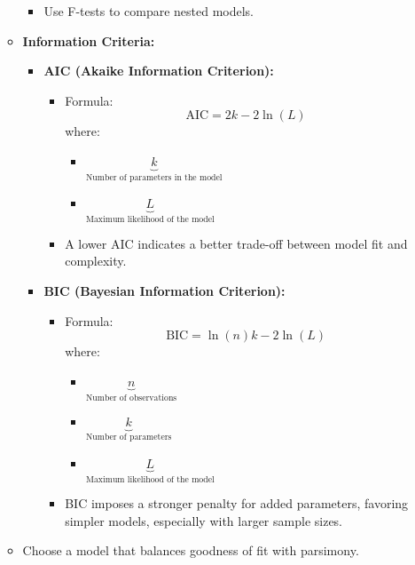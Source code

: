 \documentclass[10pt]{article}
\begin{document}
\begin{itemize}
\begin{itemize}
\begin{itemize}
            \item Use F-tests to compare nested models.
        \end{itemize}
        \item \textbf{Information Criteria:}
        \begin{itemize}
            \item \textbf{AIC (Akaike Information Criterion):}
            \begin{itemize}
                \item Formula: 
                \[
                \text{AIC} = 2k - 2\ln(L)
                \]
                where:
                \begin{itemize}
                    \item \(\underbrace{k}_{\text{Number of parameters in the model}}\)
                    \item \(\underbrace{L}_{\text{Maximum likelihood of the model}}\)
                \end{itemize}
                \item A lower AIC indicates a better trade-off between model fit and complexity.
            \end{itemize}
            \item \textbf{BIC (Bayesian Information Criterion):}
            \begin{itemize}
                \item Formula:
                \[
                \text{BIC} = \ln(n)k - 2\ln(L)
                \]
                where:
                \begin{itemize}
                    \item \(\underbrace{n}_{\text{Number of observations}}\)
                    \item \(\underbrace{k}_{\text{Number of parameters}}\)
                    \item \(\underbrace{L}_{\text{Maximum likelihood of the model}}\)
                \end{itemize}
                \item BIC imposes a stronger penalty for added parameters, favoring simpler models, especially with larger sample sizes.
            \end{itemize}
        \end{itemize}
        \item Choose a model that balances goodness of fit with parsimony.
    \end{itemize}
\end{itemize}
\end{document}
